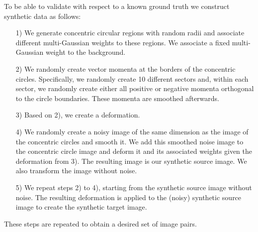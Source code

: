 \documentclass[10pt,twocolumn,letterpaper,table]{article}
\numberwithin{equation}{section}
\theoremstyle{plain}
\theoremstyle{definition}
\begin{document}
To be able to validate with respect to a known ground truth we construct synthetic data as follows:
\begin{itemize}
\item[1)] We generate concentric circular regions with random radii and associate different multi-Gaussian weights to these regions. We associate a fixed multi-Gaussian weight to the background.
\item[2)] We randomly create vector momenta at the borders of the concentric circles. Specifically, we randomly create 10 different sectors and, within each sector, we randomly create either all positive or negative momenta orthogonal to the circle boundaries. These momenta are smoothed afterwards. 
\item[3)] Based on 2), we create a deformation.
\item[4)] We randomly create a noisy image of the same dimension as the image of the concentric circles and smooth it. We add this smoothed noise image to the concentric circle image and deform it and its associated weights given the deformation from 3). The resulting image is our synthetic source image. We also transform the image without noise.
\item[5)] We repeat steps 2) to 4), starting from the synthetic source image without noise. The resulting deformation is applied to the (noisy) synthetic source image to create the synthetic target image.
\end{itemize}
These steps are repeated to obtain a desired set of image pairs.
\end{document}
